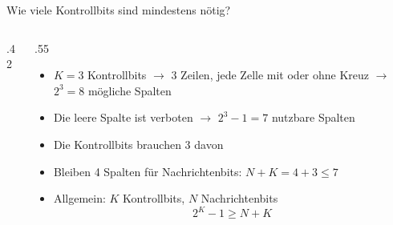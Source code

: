 \begin{frame}{Wie viele Kontrollbits sind mindestens nötig?}
\begin{columns}[T,onlytextwidth]
\begin{column}{.42\textwidth}
\begin{center}
            \end{center}
        \end{column}
        \begin{column}{.55\textwidth}
            \begin{itemize}[<+->]
                \item \(K=3\) Kontrollbits $\rightarrow$ 3 Zeilen, jede Zelle mit oder ohne Kreuz $\rightarrow$ \(2^3=8\) mögliche Spalten
                \item Die leere Spalte ist verboten $\rightarrow$ \(2^3-1=7\) nutzbare Spalten
                \item Die Kontrollbits brauchen 3 davon
                \item Bleiben 4 Spalten für Nachrichtenbits: \(N+K = 4+3 \leq 7\)
                \item Allgemein: \(K\) Kontrollbits, \(N\) Nachrichtenbits
                      \[
                          2^K-1 \geq N+K
                      \]
            \end{itemize}
        \end{column}
    \end{columns}
\end{frame}


